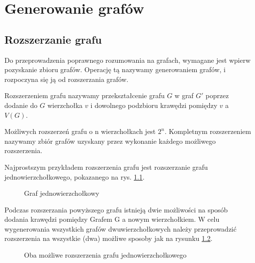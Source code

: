 \chapter{Generowanie grafów}

\section{Rozszerzanie grafu}
Do przeprowadzenia poprawnego rozumowania na grafach, wymagane jest wpierw pozyskanie zbioru grafów. Operację tą nazywamy generowaniem grafów, i rozpoczyna się ją od rozszerzania grafów. 
\begin{definition} Rozszerzeniem grafu nazywamy przekształcenie grafu $G$ w graf $G'$ poprzez dodanie do $G$ wierzchołka $v$ i dowolnego podzbioru krawędzi pomiędzy $v$ a $V(G)$.
\end{definition}
Możliwych rozszerzeń grafu o n wierzchołkach jest $2^n$. Kompletnym rozszerzeniem nazywamy zbiór grafów uzyskany przez wykonanie każdego możliwego rozszerzenia.

Najprostszym przykładem rozszerzenia grafu jest rozszerzanie grafu jednowierzchołkowego, pokazanego na rys. \ref{grafjednowierzcholkowy}.
\begin{figure}[H]
  \centering
   \caption{Graf jednowierzchołkowy}
   \label{grafjednowierzcholkowy}
\end{figure}


Podczas rozszerzania powyższego grafu istnieją dwie możliwości na sposób dodania krawędzi pomiędzy Grafem G a nowym wierzchołkiem. W celu wygenerowania wszystkich grafów dwuwierzchołkowych należy przeprowadzić rozszerzenia na wszystkie (dwa) możliwe sposoby jak na rysunku \ref{rozszerzeniedwuwierzcholkowe}.
\begin{figure}[h]
  
  \hfill
  \centering
   \hfill
   \centering
	\hfill
	\hfill
   \caption{Oba możliwe rozszerzenia grafu jednowierzchołkowego}
   \label{rozszerzeniedwuwierzcholkowe}
\end{figure}


